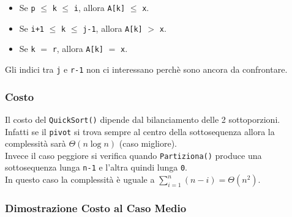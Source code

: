 \documentclass{article}
\begin{document}
\begin{itemize}
    \item Se \verb|p| $\leq$ \verb|k| $\leq$ \verb|i|, allora \verb|A[k]| $\leq$ \verb|x|.
    \item Se \verb|i+1| $\leq$ \verb|k| $\leq$ \verb|j-1|, allora \verb|A[k]| $>$ \verb|x|.
    \item Se \verb|k| $=$ \verb|r|, allora \verb|A[k]| $=$ \verb|x|.
\end{itemize}

Gli indici tra \verb|j| e \verb|r-1| non ci interessano perchè sono ancora da confrontare.

\subsubsection{Costo}

Il costo del \verb|QuickSort()| dipende dal bilanciamento delle 2 sottoporzioni. \\
Infatti se il \verb|pivot| si trova sempre al centro della sottosequenza allora la complessità sarà $\Theta(n \log n)$ (caso migliore). \\
Invece il caso peggiore si verifica quando \verb|Partiziona()| produce una sottosequenza lunga \verb|n-1| e l'altra quindi lunga \verb|0|. \\
In questo caso la complessità è uguale a $\displaystyle \sum_{i = 1}^n (n - i) = \Theta(n^2)$.

\subsubsection{Dimostrazione Costo al Caso Medio}
\end{document}
